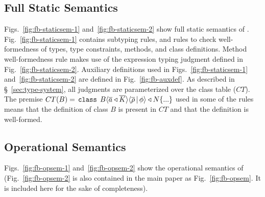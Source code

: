\subsection{Full Static Semantics}




Figs.~\ref{fig:fb-staticsem-1} and~\ref{fig:fb-staticsem-2} show full
static semantics of \FB. Fig.~\ref{fig:fb-staticsem-1} contains subtyping
rules, and rules to check well-formedness of \FB types, type
constraints, methods, and class definitions. Method well-formedness
rule makes use of the expression typing judgment defined in
Fig.~\ref{fig:fb-staticsem-2}. Auxiliary definitions used in
Figs.~\ref{fig:fb-staticsem-1} and~\ref{fig:fb-staticsem-2} are
defined in Fig.~\ref{fig:fb-auxdef}. As described in
\S~\ref{sec:type-system}, all judgments are parameterized over the
class table ($CT$). The premise $CT(B) = \,{\tt class}\,\; B\langle \overline{a} \triangleleft \overline{K} \rangle\langle \overline{\rho} \,|\, \phi \rangle \triangleleft N\{...\}$
used in some of the rules means that the definition of class $B$ is
present in $CT$ and that the definition is well-formed.

\subsection{Operational Semantics}


Figs.~\ref{fig:fb-opsem-1} and~\ref{fig:fb-opsem-2} show the
operational semantics of \fbname (Fig.~\ref{fig:fb-opsem-2} is also
contained in the main paper as Fig.~\ref{fig:fb-opsem}. It is included
here for the sake of completeness). 
